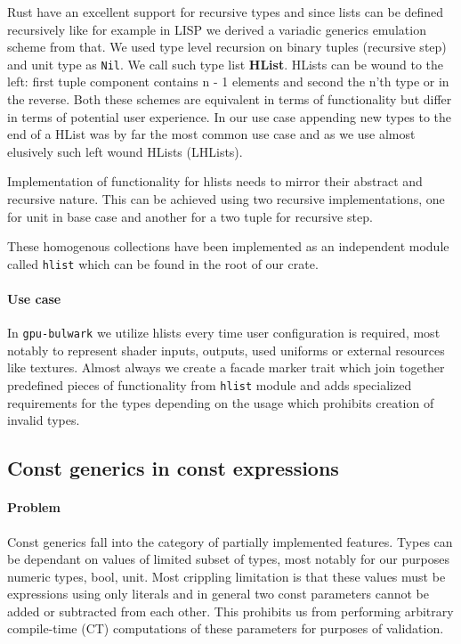 Rust have an excellent support for recursive types and since lists can be defined recursively like for example in LISP we derived a variadic generics emulation scheme from that.
We used type level recursion on binary tuples (recursive step) and unit type as \texttt{Nil}. We call such type list \textbf{HList}.
HLists can be wound to the left: first tuple component contains n - 1 elements and second the n'th type or in the reverse.
Both these schemes are equivalent in terms of functionality but differ in terms of potential user experience.
In our use case appending new types to the end of a HList was by far the most common use case and as we use almost elusively such left wound HLists (LHLists).

Implementation of functionality for hlists needs to mirror their abstract and recursive nature. This can be achieved using two recursive implementations, one for unit in base case and another for a two tuple for recursive step.

These homogenous collections have been implemented as an independent module called \texttt{hlist} which can be found in the root of our crate.
 
\paragraph{Use case}

In \texttt{gpu-bulwark} we utilize hlists every time user configuration is required, most notably to represent shader inputs, outputs, used uniforms or external resources like textures.
Almost always we create a facade marker trait which join together predefined pieces of functionality from \texttt{hlist} module and adds specialized requirements for the types depending on the usage which prohibits creation of invalid types.

\subsection{Const generics in const expressions}

\paragraph{Problem}

Const generics fall into the category of partially implemented features. Types can be dependant on values of limited subset of types, most notably for our purposes numeric types, bool, unit.
Most crippling limitation is that these values must be expressions using only literals and in general two const parameters cannot be added or subtracted from each other. 
This prohibits us from performing arbitrary compile-time (CT) computations of these parameters for purposes of validation.

